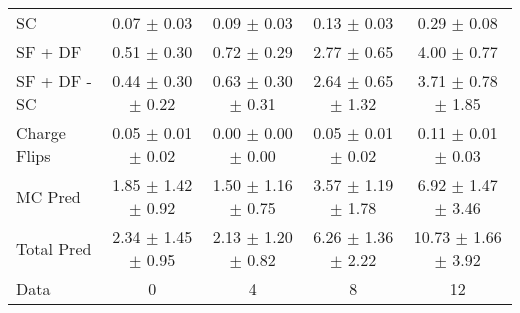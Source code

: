 \begin{tabular}{l|cccc}
                                 SC &  0.07 $\pm$  0.03 &  0.09 $\pm$  0.03 &  0.13 $\pm$  0.03 &  0.29 $\pm$  0.08 \\
                            SF + DF &  0.51 $\pm$  0.30 &  0.72 $\pm$  0.29 &  2.77 $\pm$  0.65 &  4.00 $\pm$  0.77 \\
\hline
                       SF + DF - SC &  0.44 $\pm$  0.30 $\pm$  0.22 &  0.63 $\pm$  0.30 $\pm$  0.31 &  2.64 $\pm$  0.65 $\pm$  1.32 &  3.71 $\pm$  0.78 $\pm$  1.85 \\
\hline\hline
                       Charge Flips &  0.05 $\pm$  0.01 $\pm$  0.02 &  0.00 $\pm$  0.00 $\pm$  0.00 &  0.05 $\pm$  0.01 $\pm$  0.02 &  0.11 $\pm$  0.01 $\pm$  0.03 \\
\hline
                            MC Pred &  1.85 $\pm$  1.42 $\pm$  0.92 &  1.50 $\pm$  1.16 $\pm$  0.75 &  3.57 $\pm$  1.19 $\pm$  1.78 &  6.92 $\pm$  1.47 $\pm$  3.46 \\
\hline
                         Total Pred &  2.34 $\pm$  1.45 $\pm$  0.95 &  2.13 $\pm$  1.20 $\pm$  0.82 &  6.26 $\pm$  1.36 $\pm$  2.22 & 10.73 $\pm$  1.66 $\pm$  3.92 \\
\hline\hline
                               Data &     0 &     4 &     8 &    12 \\
\hline\hline
\end{tabular}

